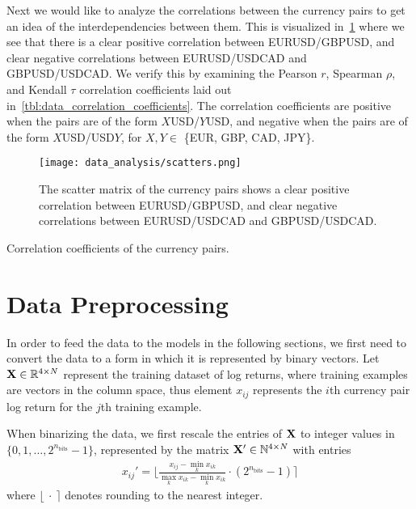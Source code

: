 Next we would like to analyze the correlations between the currency pairs to get an idea of the interdependencies between them.
This is visualized in~\cref{fig:scatters} where we see that there is a clear positive correlation between EURUSD/GBPUSD, and clear negative correlations between EURUSD/USDCAD and GBPUSD/USDCAD.
We verify this by examining the Pearson \( r \), Spearman \( \rho \), and Kendall \( \tau \) correlation coefficients laid out in~\cref{tbl:data_correlation_coefficients}.
The correlation coefficients are positive when the pairs are of the form \( X \)USD/\( Y \)USD, and negative when the pairs are of the form \( X \)USD/USD\( Y \), for \( X,Y \in \) \{EUR, GBP, CAD, JPY\}.
\begin{figure}[!htb]
    \begin{center}
        \texttt{[image: data\_analysis/scatters.png]}
    \end{center}
    \caption{The scatter matrix of the currency pairs shows a clear positive correlation between EURUSD/GBPUSD, and clear negative correlations between EURUSD/USDCAD and GBPUSD/USDCAD.}
    \label{fig:scatters}
\end{figure}

\begin{table}[!htb]
    \centering
    \begin{adjustbox}{max width=\textwidth}
        
    \end{adjustbox}
    \caption{Correlation coefficients of the currency pairs.}
    \label{tbl:data_correlation_coefficients}
\end{table}


\section{Data Preprocessing}
In order to feed the data to the models in the following sections, we first need to convert the data to a form in which it is represented by binary vectors.
Let \( \mathbf{X} \in \mathbb{R}^{4 \times N} \) represent the training dataset of log returns, where training examples are vectors in the column space, thus element \( x_{ij} \) represents the \( i \)th currency pair log return for the \( j \)th training example.

When binarizing the data, we first rescale the entries of \( \mathbf{X} \) to integer values in \( \{0, 1, \dots, 2^{n_\text{bits}} - 1\} \), represented by the matrix \( \mathbf{X}' \in \mathbb{N}^{4 \times N} \) with entries
\begin{align}
    x_{ij}' = \bigg\lfloor \frac{x_{ij} - \min_k x_{ik}}{\max_k x_{ik} - \min_k x_{ik}} \cdot (2^{n_\text{bits}} - 1) \bigg\rceil
\end{align}
where \( \lfloor \ \cdot \ \rceil \) denotes rounding to the nearest integer.

